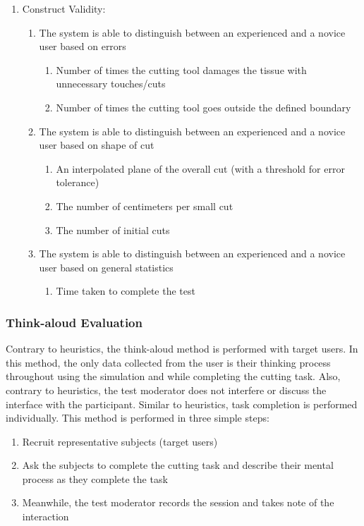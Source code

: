 \begin{enumerate}[1.]
  \item Construct Validity:
	\begin{enumerate}[\em a\em)]
	  \item The system is able to distinguish between an experienced and a novice user based on errors
	  \begin{enumerate}[\em i\em)]
	    \item Number of times the cutting tool damages the tissue with unnecessary touches/cuts
	    \item Number of times the cutting tool goes outside the defined boundary
	  \end{enumerate}
	  \item The system is able to distinguish between an experienced and a novice user based on shape of cut
	  \begin{enumerate}[\em i\em)]
		  \item An interpolated plane of the overall cut (with a threshold for error tolerance)
		  \item The number of centimeters per small cut
		  \item The number of initial cuts
	  \end{enumerate}
	  \item The system is able to distinguish between an experienced and a novice user based on general statistics
	  \begin{enumerate}[\em i\em)]
		  \item Time taken to complete the test
	  \end{enumerate}
  \end{enumerate}
\end{enumerate}

\subsubsection{Think-aloud Evaluation}
Contrary to heuristics, the think-aloud method is performed with target users. In this method, the only data collected from the user is their thinking process throughout using the simulation and while completing the cutting task. Also, contrary to heuristics, the test moderator does not interfere or discuss the interface with the participant. Similar to heuristics, task completion is performed individually. This method is performed in three simple steps:

\begin{enumerate}[1.]
  \item Recruit representative subjects (target users)
  \item Ask the subjects to complete the cutting task and describe their mental process as they complete the task
  \item Meanwhile, the test moderator records the session and takes note of the interaction
\end{enumerate}

